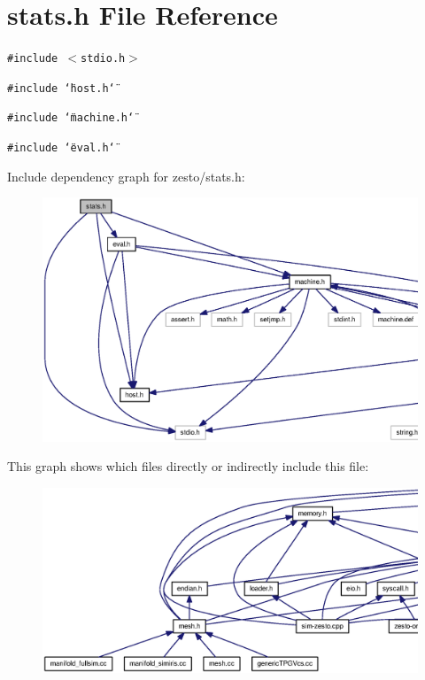 \section{stats.h File Reference}
\label{zesto_2stats_8h}
{\tt \#include $<$stdio.h$>$}\par
{\tt \#include \char`\"{}host.h\char`\"{}}\par
{\tt \#include \char`\"{}machine.h\char`\"{}}\par
{\tt \#include \char`\"{}eval.h\char`\"{}}\par


Include dependency graph for zesto/stats.h:\nopagebreak
\begin{figure}[H]
\begin{center}
\leavevmode
\includegraphics[width=412pt]{zesto_2stats_8h__incl}
\end{center}
\end{figure}


This graph shows which files directly or indirectly include this file:\nopagebreak
\begin{figure}[H]
\begin{center}
\leavevmode
\includegraphics[width=420pt]{zesto_2stats_8h__dep__incl}
\end{center}
\end{figure}
